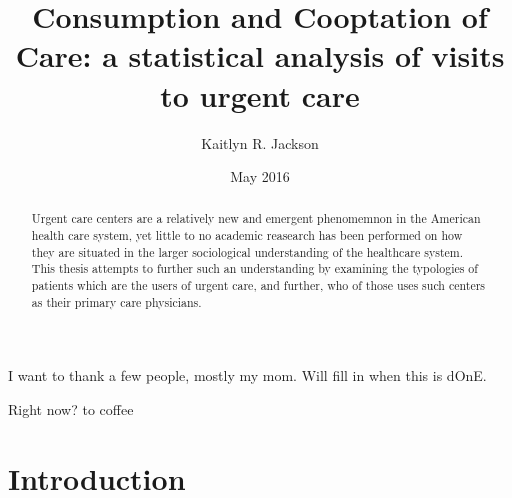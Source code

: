 \documentclass[12pt,twoside]{reedthesis}
\title{Consumption and Cooptation of Care: a statistical analysis of visits to
urgent care}
\author{Kaitlyn R. Jackson}
\date{May 2016}
\begin{document}
      \maketitle
  
  \frontmatter %
  \pagestyle{empty} %

      \begin{acknowledgements}
      I want to thank a few people, mostly my mom. Will fill in when this is
      dOnE.
    \end{acknowledgements}
  
  

      \hypersetup{linkcolor=black}
    \setcounter{tocdepth}{2}
    \tableofcontents
  
      \listoftables
  
      \listoffigures
  
      \begin{abstract}
      Urgent care centers are a relatively new and emergent phenomemnon in the
      American health care system, yet little to no academic reasearch has
      been performed on how they are situated in the larger sociological
      understanding of the healthcare system. This thesis attempts to further
      such an understanding by examining the typologies of patients which are
      the users of urgent care, and further, who of those uses such centers as
      their primary care physicians.
    \end{abstract}
  
      \begin{dedication}
      Right now? to coffee
    \end{dedication}
  
  \mainmatter %
  \pagestyle{fancyplain} %

  \chapter*{Introduction}\label{introduction}
  
  \onehalfspacing
  
\end{document}
